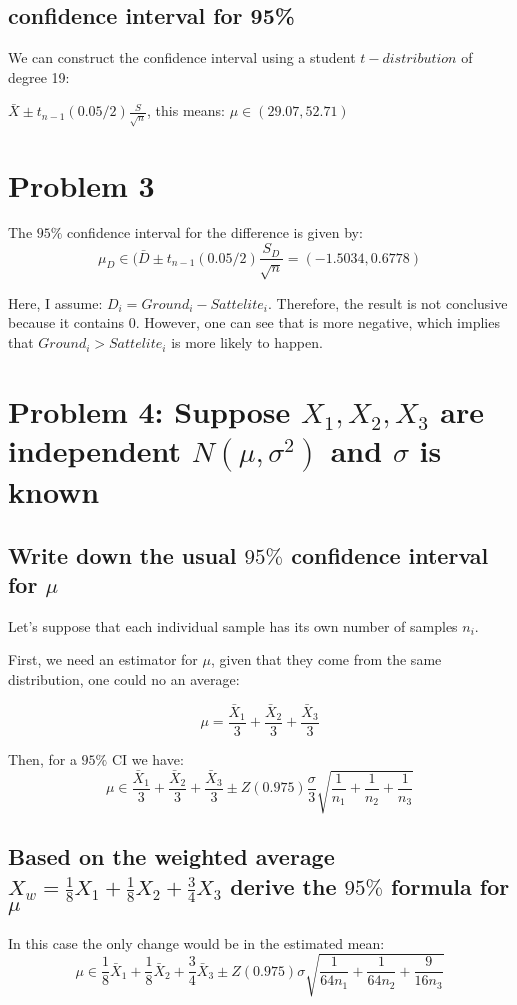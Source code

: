 \documentclass[10pt]{article}
\begin{document}
\subsection{confidence interval for 95\%}

We can construct the confidence interval using a student $t-distribution$ of degree 19:

$ \bar{X} \pm t_{n-1}(0.05/2) \frac{S}{\sqrt{n}}$, this means: $\mu \in (29.07,52.71)$


\section{Problem 3}

The $95\%$ confidence interval for the difference is given by:
\[
\mu_D \in (\bar{D} \pm  t_{n-1}(0.05/2) \frac{S_D}{\sqrt{n}}=(-1.5034, 0.6778)
\]

Here, I assume: $D_i = Ground_i -Sattelite_i$. Therefore,
the result is not conclusive because it contains $0$. However,
 one can see that is more negative, which implies that $Ground_i > Sattelite_i$ is
more likely to happen.

\section{Problem 4: Suppose $X_1,X_2,X_3$ are independent $N(\mu,\sigma^2)$ and $\sigma$ is known} 

\subsection{Write down the usual $95\%$ confidence interval for $\mu$}
Let's suppose that each individual sample has its own number of samples $n_i$. 

First, we need an estimator for $\mu$, given that they come from the same distribution, one could
no an average:

\[
\mu = \frac{\bar{X}_1}{3}+\frac{\bar{X}_2}{3} +\frac{\bar{X}_3}{3}
\]

Then, for a $95\%$ CI we have:
\[
 \mu \in \frac{\bar{X}_1}{3}+\frac{\bar{X}_2}{3} +\frac{\bar{X}_3}{3} \pm Z(0.975)\frac{\sigma}{3}\sqrt{\frac{1}{n_1} +\frac{1}{n_2}+\frac{1}{n_3}}
\]



\subsection{Based on the weighted average $X_w = \frac{1}{8}X_1 + \frac{1}{8}X_2+ \frac{3}{4}X_3$ derive the $95\%$ formula for $\mu$}
In this case the only change would be in the estimated mean:
\[
\mu \in \frac{1}{8}\bar{X}_1 + \frac{1}{8}\bar{X}_2+ \frac{3}{4}\bar{X}_3 \pm Z(0.975)\sigma\sqrt{\frac{1}{64n_1} +\frac{1}{64n_2}+\frac{9}{16n_3}}
\]
\end{document}
